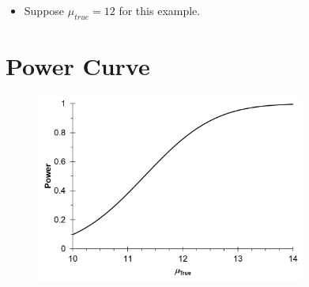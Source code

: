 \documentclass[12pt]{article}
\begin{document}
\begin{itemize}
\itemsep1pt\parskip0pt
\item
  Suppose \(\mu_{true} = 12\) for this example.
\end{itemize}

\section{Power Curve}\label{power-curve}

\begin{figure}[H]
\centering
\includegraphics[width=3.5in]{power_curve.png}
\caption{}
\end{figure}
\end{document}
